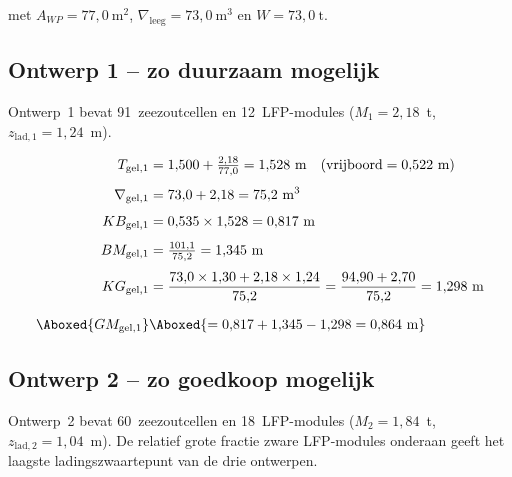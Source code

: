 met $A_{WP} = 77{,}0\ \mathrm{m^2}$, $\nabla_\mathrm{leeg} = 73{,}0\ \mathrm{m^3}$
en $W = 73{,}0\ \mathrm{t}$.

\subsection{Ontwerp 1 -- zo duurzaam mogelijk}
\label{sec:stab_ontwerp1}

Ontwerp~1 bevat 91~zeezoutcellen en 12~LFP-modules
($M_1 = 2{,}18$~t, $z_\mathrm{lad,1} = 1{,}24$~m).

\begin{align}
    T_{\mathrm{gel},1}      &= 1{,}500 + \tfrac{2{,}18}{77{,}0}
                             = 1{,}528\ \mathrm{m}
                             \quad(\text{vrijboord} = 0{,}522\ \mathrm{m}) \\[4pt]
    \nabla_{\mathrm{gel},1} &= 73{,}0 + 2{,}18 = 75{,}2\ \mathrm{m^3} \\[4pt]
    KB_{\mathrm{gel},1}     &= 0{,}535 \times 1{,}528 = 0{,}817\ \mathrm{m} \\[4pt]
    BM_{\mathrm{gel},1}     &= \tfrac{101{,}1}{75{,}2} = 1{,}345\ \mathrm{m} \\[4pt]
    KG_{\mathrm{gel},1}     &= \frac{73{,}0 \times 1{,}30 + 2{,}18 \times 1{,}24}
                                    {75{,}2}
                             = \frac{94{,}90 + 2{,}70}{75{,}2}
                             = 1{,}298\ \mathrm{m} \\[6pt]
    \Aboxed{GM_{\mathrm{gel},1}} &\Aboxed{= 0{,}817 + 1{,}345 - 1{,}298
                             = 0{,}864\ \mathrm{m}}
\end{align}

\subsection{Ontwerp 2 -- zo goedkoop mogelijk}
\label{sec:stab_ontwerp2}

Ontwerp~2 bevat 60~zeezoutcellen en 18~LFP-modules
($M_2 = 1{,}84$~t, $z_\mathrm{lad,2} = 1{,}04$~m). De relatief grote
fractie zware LFP-modules onderaan geeft het laagste ladingszwaartepunt
van de drie ontwerpen.

